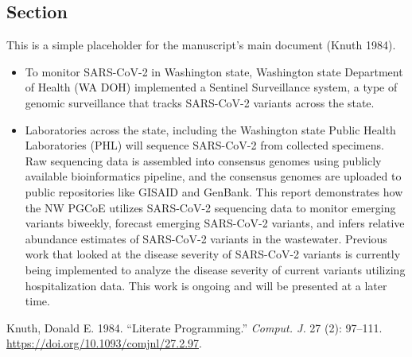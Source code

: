 \documentclass[
  twocolumn]{article}
\providecommand{\tightlist}{%
  \setlength{\itemsep}{0pt}\setlength{\parskip}{0pt}}\usepackage{longtable,booktabs,array}
\newlength{\cslhangindent}
\newenvironment{CSLReferences}[2] %
 {\begin{list}{}{%
  \setlength{\itemindent}{0pt}
  \setlength{\leftmargin}{0pt}
  \setlength{\parsep}{0pt}
  \ifodd #1
   \setlength{\leftmargin}{\cslhangindent}
   \setlength{\itemindent}{-1\cslhangindent}
  \fi
  \setlength{\itemsep}{#2\baselineskip}}}
 {\end{list}}
\begin{document}
\subsection{Section}\label{section}

This is a simple placeholder for the manuscript's main document (Knuth
1984).

\begin{itemize}
\tightlist
\item
  To monitor SARS-CoV-2 in Washington state, Washington state Department
  of Health (WA DOH) implemented a Sentinel Surveillance system, a type
  of genomic surveillance that tracks SARS-CoV-2 variants across the
  state.
\item
  Laboratories across the state, including the Washington state Public
  Health Laboratories (PHL) will sequence SARS-CoV-2 from collected
  specimens. Raw sequencing data is assembled into consensus genomes
  using publicly available bioinformatics pipeline, and the consensus
  genomes are uploaded to public repositories like GISAID and GenBank.
  This report demonstrates how the NW PGCoE utilizes SARS-CoV-2
  sequencing data to monitor emerging variants biweekly, forecast
  emerging SARS-CoV-2 variants, and infers relative abundance estimates
  of SARS-CoV-2 variants in the wastewater. Previous work that looked at
  the disease severity of SARS-CoV-2 variants is currently being
  implemented to analyze the disease severity of current variants
  utilizing hospitalization data. This work is ongoing and will be
  presented at a later time.
\end{itemize}

\label{refs}
\begin{CSLReferences}{1}{0}
Knuth, Donald E. 1984. {``Literate Programming.''} \emph{Comput. J.} 27
(2): 97--111. \url{https://doi.org/10.1093/comjnl/27.2.97}.

\end{CSLReferences}
\end{document}
